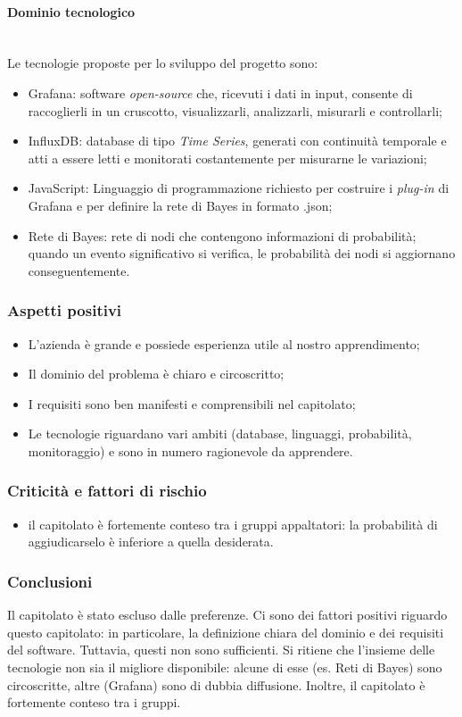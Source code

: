 \paragraph {Dominio tecnologico} \mbox{} \\
Le tecnologie proposte per lo sviluppo del progetto sono:
\begin{itemize}
	\item Grafana: software \textit{open-source} che, ricevuti i dati in input,
	 consente di raccoglierli in un cruscotto, visualizzarli, analizzarli, 
	 misurarli e controllarli;
	\item InfluxDB: database di tipo \textit{Time Series}, generati con continuità
	 temporale e atti a essere letti e monitorati costantemente per misurarne 
	 le variazioni;
	\item JavaScript: Linguaggio di programmazione richiesto per costruire i 
	\textit{plug-in} di Grafana e per definire la rete di Bayes in formato .json;
	\item Rete di Bayes: rete di nodi che contengono informazioni di probabilità;
	 quando un evento significativo si verifica, le probabilità dei nodi si aggiornano 
	 conseguentemente.
\end{itemize}
\subsubsection{Aspetti positivi}
\begin{itemize}
	\item L'azienda è grande e possiede esperienza utile al nostro apprendimento;
	\item Il dominio del problema è chiaro e circoscritto;
	\item I requisiti sono ben manifesti e comprensibili nel capitolato;
	\item Le tecnologie riguardano vari ambiti (database, linguaggi, probabilità, 
	monitoraggio) e sono in numero ragionevole da apprendere.
\end{itemize}
\subsubsection{Criticità e fattori di rischio}
\begin{itemize}
	\item il capitolato è fortemente conteso tra i gruppi appaltatori: la probabilità
	 di aggiudicarselo è inferiore a quella desiderata.
\end{itemize}
\subsubsection{Conclusioni}
Il capitolato è stato escluso dalle preferenze. Ci sono dei fattori positivi riguardo
 questo capitolato: in particolare, la definizione chiara del dominio e dei requisiti 
 del software.
Tuttavia, questi non sono sufficienti.
Si ritiene che l'insieme delle tecnologie non sia il migliore disponibile: alcune di 
esse (es. Reti di Bayes) sono circoscritte, altre (Grafana) sono di dubbia diffusione.
Inoltre, il capitolato è fortemente conteso tra i gruppi. 